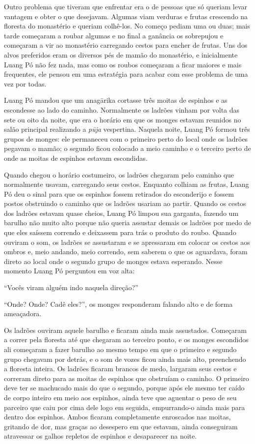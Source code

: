 Outro problema que tiveram que enfrentar era o de pessoas que só queriam
levar vantagem e obter o que desejavam. Algumas viam verduras e frutas
crescendo na floresta do monastério e queriam colhê-los. No começo
pediam uma ou duas; mais tarde começaram a roubar algumas e no final a
ganância os sobrepujou e começaram a vir ao monastério carregando cestos
para encher de frutas. Uns dos alvos preferidos eram os diversos pés de
mamão do monastério, e inicialmente Luang Pó não fez nada, mas como os
roubos começaram a ficar maiores e mais frequentes, ele pensou em uma
estratégia para acabar com esse problema de uma vez por todas.

Luang Pó mandou que um anagārika cortasse três moitas de espinhos e as
escondesse ao lado do caminho. Normalmente os ladrões vinham por volta
das sete ou oito da noite, que era o horário em que os monges estavam
reunidos no salão principal realizando a \emph{pūja} vespertina. Naquela
noite, Luang Pó formou três grupos de monges: ele permaneceu com o
primeiro perto do local onde os ladrões pegavam o mamão; o segundo ficou
colocado a meio caminho e o terceiro perto de onde as moitas de espinhos
estavam escondidas.

Quando chegou o horário costumeiro, os ladrões chegaram pelo caminho que
normalmente usavam, carregando seus cestos. Enquanto colhiam as frutas,
Luang Pó deu o sinal para que os espinhos fossem retirados do
esconderijo e fossem postos obstruindo o caminho que os ladrões usariam
ao partir. Quando os cestos dos ladrões estavam quase cheios, Luang Pó
limpou sua garganta, fazendo um barulho não muito alto porque não queria
assustar demais os ladrões por medo de que eles saíssem correndo e
deixassem para trás o produto do roubo. Quando ouviram o som, os ladrões
se assustaram e se apressaram em colocar os cestos aos ombros e, meio
andando, meio correndo, sem saberem o que os aguardava, foram direto ao
local onde o segundo grupo de monges estava esperando. Nesse momento
Luang Pó perguntou em voz alta:

``Vocês viram alguém indo naquela direção?''

``Onde? Onde? Cadê eles?'', os monges responderam falando alto e de
forma ameaçadora.

Os ladrões ouviram aquele barulho e ficaram ainda mais assustados.
Começaram a correr pela floresta até que chegaram ao terceiro ponto, e
os monges escondidos ali começaram a fazer barulho ao mesmo tempo em que
o primeiro e segundo grupo chegavam por detrás, e o som de vozes ficou
ainda mais alto, preenchendo a floresta inteira. Os ladrões ficaram
brancos de medo, largaram seus cestos e correram direto para as moitas
de espinhos que obstruíam o caminho. O primeiro deve ter se machucado
mais do que o segundo, porque após ele mesmo ter caído de corpo inteiro
em meio aos espinhos, ainda teve que aguentar o peso de seu parceiro que
caiu por cima dele logo em seguida, empurrando-o ainda mais para dentro
dos espinhos. Ambos ficaram completamente enroscados nas moitas,
gritando de dor, mas graças ao desespero em que estavam, ainda
conseguiram atravessar os galhos repletos de espinhos e desaparecer na
noite.

